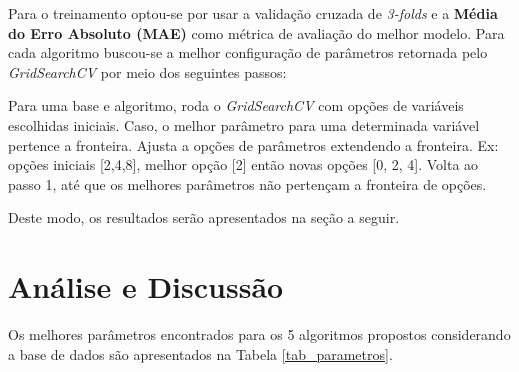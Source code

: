 \documentclass[12pt]{article}
\begin{document}
Para o treinamento optou-se por usar a validação cruzada de \textit{3-folds} e a  \textbf{Média do Erro Absoluto (MAE)} como métrica de avaliação do melhor modelo. Para cada algoritmo buscou-se a melhor configuração de parâmetros retornada pelo \textit{GridSearchCV} por meio dos seguintes passos:

\begin{outline}[enumerate]
  \1 Para uma base e algoritmo, roda o \textit{GridSearchCV} com opções de variáveis escolhidas iniciais.
  \1 Caso, o melhor parâmetro para uma determinada variável pertence a fronteira.
  \2 Ajusta a opções de parâmetros extendendo a fronteira. Ex: opções iniciais [2,4,8], melhor opção [2] então novas opções [0, 2, 4].
  \1 Volta ao passo 1, até que os melhores parâmetros não pertençam a fronteira de opções.
\end{outline}

Deste modo, os resultados serão apresentados na seção a seguir.

\section{Análise e Discussão}

Os melhores parâmetros encontrados para os 5 algoritmos propostos considerando a base de dados são apresentados na Tabela \ref{tab_parametros}.
\end{document}
